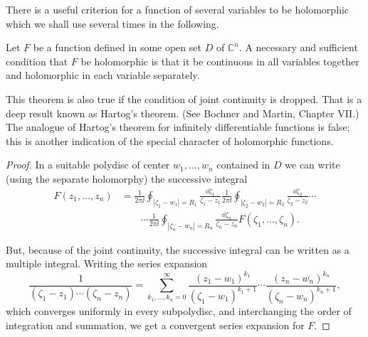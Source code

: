 There is a useful criterion for a function of several variables to be
holomorphic which we shall use several times in the following.

\begin{theorem}[2-4]\label{thm:ch2-separate-holomorphy}
Let $F$ be a function defined in some open set $D$ of $\mathbb{C}^n$.  A
necessary and sufficient condition that $F$ be holomorphic is that it be
continuous in all variables together and holomorphic in each variable
separately.
\end{theorem}

\begin{remark*}
This theorem is also true if the condition of joint continuity is dropped.
That is a deep result known as Hartog's theorem.  (See Bochner and Martin,
Chapter VII.)  The analogue of Hartog's theorem for infinitely
differentiable functions is false; this is another indication of the special
character of holomorphic functions.
\end{remark*}

\begin{proof}
In a suitable polydisc of center $w_1,\ldots,w_n$ contained in $D$ we can
write (using the separate holomorphy) the successive integral
\begin{equation*}
\begin{aligned}
  F(z_1,\ldots,z_n)
  &=\frac{1}{2\pi \ii}\oint_{|\zeta_1-w_1|=R_1}
    \frac{\dd\zeta_1}{\zeta_1-z_1}\frac{1}{2\pi \ii}
    \oint_{|\zeta_2-w_2|=R_2}\frac{\dd\zeta_2}{\zeta_2-z_2}\cdots \\
  &\qquad\cdots\frac{1}{2\pi \ii}
    \oint_{|\zeta_n-w_n|=R_n}\frac{\dd\zeta_n}{\zeta_n-z_n}
    F(\zeta_1,\ldots,\zeta_n).
\end{aligned}
\end{equation*}

But, because of the joint continuity, the successive integral can be
written as a multiple integral.  Writing the series expansion
\begin{equation*}
  \frac{1}{(\zeta_1-z_1)\cdots(\zeta_n-z_n)}
  =\sum_{k_1,\ldots,k_n=0}^{\infty}
  \frac{(z_1-w_1)^{k_1}}{(\zeta_1-w_1)^{k_1+1}}\cdots
  \frac{(z_n-w_n)^{k_n}}{(\zeta_n-w_n)^{k_n+1}},
\end{equation*}
which converges uniformly in every subpolydisc, and interchanging the order
of integration and summation, we get a convergent series expansion for
$F$.
\end{proof}

